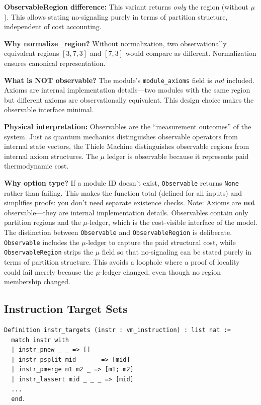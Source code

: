 \textbf{ObservableRegion difference:} This variant returns \textit{only} the region (without $\mu$). This allows stating no-signaling purely in terms of partition structure, independent of cost accounting.

\textbf{Why normalize\_region?} Without normalization, two observationally equivalent regions $[3, 7, 3]$ and $[7, 3]$ would compare as different. Normalization ensures canonical representation.

\textbf{What is NOT observable?} The module's \texttt{module\_axioms} field is \textit{not} included. Axioms are internal implementation details---two modules with the same region but different axioms are observationally equivalent. This design choice makes the observable interface minimal.


\textbf{Physical interpretation:} Observables are the ``measurement outcomes'' of the system. Just as quantum mechanics distinguishes observable operators from internal state vectors, the Thiele Machine distinguishes observable regions from internal axiom structures. The $\mu$ ledger is observable because it represents paid thermodynamic cost.

\textbf{Why option type?} If a module ID doesn't exist, \texttt{Observable} returns \texttt{None} rather than failing. This makes the function total (defined for all inputs) and simplifies proofs: you don't need separate existence checks.
Note: Axioms are \textbf{not} observable—they are internal implementation details. Observables contain only partition regions and the $\mu$-ledger, which is the cost-visible interface of the model.
The distinction between \texttt{Observable} and \texttt{ObservableRegion} is deliberate. \texttt{Observable} includes the $\mu$-ledger to capture the paid structural cost, while \texttt{ObservableRegion} strips the $\mu$ field so that no-signaling can be stated purely in terms of partition structure. This avoids a loophole where a proof of locality could fail merely because the $\mu$-ledger changed, even though no region membership changed.

\subsection{Instruction Target Sets}

\begin{lstlisting}
Definition instr_targets (instr : vm_instruction) : list nat :=
  match instr with
  | instr_pnew _ _ => []
  | instr_psplit mid _ _ _ => [mid]
  | instr_pmerge m1 m2 _ => [m1; m2]
  | instr_lassert mid _ _ _ => [mid]
  ...
  end.
\end{lstlisting}

